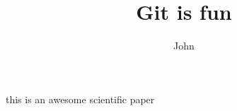 \documentclass[10pt]{article}
\author{John}
\title{Git is fun}
\begin{document}
	\maketitle
	
	this is an awesome scientific paper
	
\end{document}
